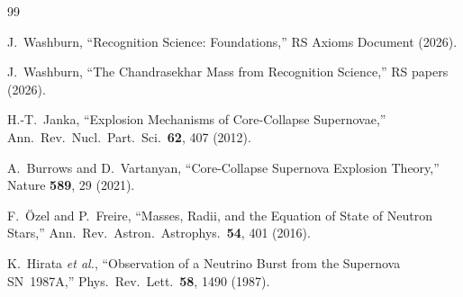 \documentclass[12pt,a4paper]{article}
\theoremstyle{definition}
\theoremstyle{remark}
\begin{document}
\begin{thebibliography}{99}

J.~Washburn, ``Recognition Science: Foundations,''
RS Axioms Document (2026).

J.~Washburn, ``The Chandrasekhar Mass from Recognition Science,''
RS papers (2026).

H.-T.~Janka, ``Explosion Mechanisms of Core-Collapse Supernovae,''
Ann.\ Rev.\ Nucl.\ Part.\ Sci.\ \textbf{62}, 407 (2012).

A.~Burrows and D.~Vartanyan, ``Core-Collapse Supernova Explosion
Theory,'' Nature \textbf{589}, 29 (2021).

F.~\"Ozel and P.~Freire, ``Masses, Radii, and the Equation of State
of Neutron Stars,'' Ann.\ Rev.\ Astron.\ Astrophys.\ \textbf{54},
401 (2016).

K.~Hirata \textit{et al.}, ``Observation of a Neutrino Burst from
the Supernova SN~1987A,'' Phys.\ Rev.\ Lett.\ \textbf{58}, 1490
(1987).

\end{thebibliography}
\end{document}
